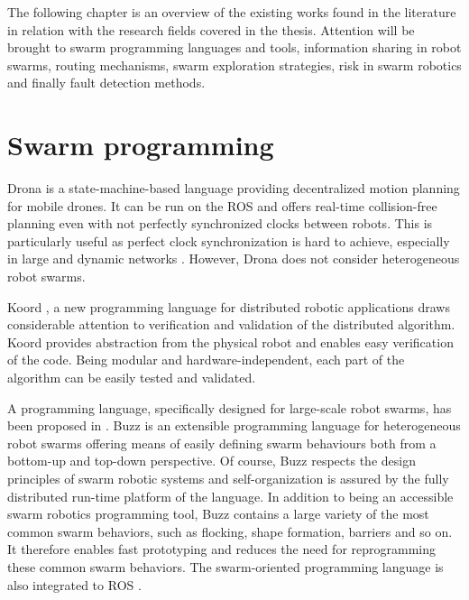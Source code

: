 \label{sec:RevLitt}
The following chapter is an overview of the existing works found in the literature in relation with the research fields covered in the thesis. Attention will be brought to swarm programming languages and tools, information sharing in robot swarms, routing mechanisms, swarm exploration strategies, risk in swarm robotics and finally fault detection methods. 

\section{Swarm programming}
Drona \cite{desai2017drona} is a state-machine-based language providing decentralized motion planning for mobile drones. It can be run on the \ac{ROS} \cite{quigley2009ros} and offers real-time collision-free planning even with not perfectly synchronized clocks between robots. This is particularly useful as perfect clock synchronization is hard to achieve, especially in large and dynamic networks \cite{cao2021distributed}. However, Drona does not consider heterogeneous robot swarms.

Koord \cite{ghosh2020koord}, a new programming language for distributed robotic applications draws considerable attention to verification and validation of the distributed algorithm. Koord provides abstraction from the physical robot and enables easy verification of the code. Being modular and hardware-independent, each part of the algorithm can be easily tested and validated.

A programming language, specifically designed for large-scale robot swarms, has been proposed in \cite{pinciroliBuzz2016}. Buzz is an extensible programming language for heterogeneous robot swarms offering means of easily defining swarm behaviours both from a bottom-up and top-down perspective. Of course, Buzz respects the design principles of swarm robotic systems and self-organization is assured by the fully distributed run-time platform of the language. In addition to being an accessible swarm robotics programming tool, Buzz contains a large variety of the most common swarm behaviors, such as flocking, shape formation, barriers and so on. It therefore enables fast prototyping and reduces the need for reprogramming these common swarm behaviors. The swarm-oriented programming language is also integrated to ROS \cite{st2017ros}.

